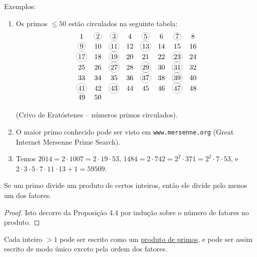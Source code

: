Exemplos:
\begin{enumerate}[left=0.5cm, align=left, nosep]
    \item Os primos $\leq 50$ estão circulados na seguinte tabela:   
    \[
        \begin{array}{cccccccc}
        1 & \circled{2} & \circled{3} & 4 & \circled{5} & 6 & \circled{7} & 8 \\
        \circled{9} & 10 & \circled{11} & 12 & \circled{13} & 14 & 15 & 16 \\
        \circled{17} & 18 & \circled{19} & 20 & 21 & 22 & \circled{23} & 24 \\
        25 & 26 & \circled{27} & 28 & \circled{29} & 30 & \circled{31} & 32 \\
        33 & 34 & 35 & 36 & \circled{37} & 38 & \circled{39} & 40 \\
        \circled{41} & 42 & \circled{43} & 44 & 45 & 46 & \circled{47} & 48 \\
        49 & 50 &   &   &   &   &   &   
        \end{array}
    \]
    
    \begin{center}
        (Crivo de Eratóstenes – números primos circulados).      
    \end{center}

    \item O maior primo conhecido pode ser visto em \texttt{www.mersenne.org} (Great Internet Mersenne Prime Search).  
    \item Temos $2014 = 2 \cdot 1007 = 2 \cdot 19 \cdot 53$, $1484 = 2 \cdot 742 = 2^2 \cdot 371 = 2^2 \cdot 7 \cdot 53$, e $2 \cdot 3 \cdot 5 \cdot 7 \cdot 11 \cdot 13 + 1 = 59509$.  
\end{enumerate}

\begin{proposicao}
Se um primo divide um produto de certos inteiros, então ele divide pelo menos um dos fatores.
\end{proposicao}

\begin{proof}
Isto decorre da Proposição 4.4 por indução sobre o número de fatores no produto.
\end{proof}

\begin{teorema}
Cada inteiro $> 1$ pode ser escrito como um \underline{produto de primos}, e pode ser assim escrito de modo único exceto pela ordem dos fatores.
\end{teorema}


